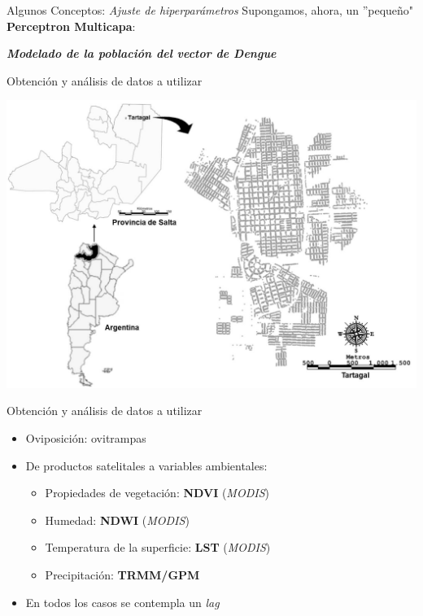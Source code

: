\documentclass[10pt]{beamer}
\newcommand\IncrFont{\fontsize{20}{20}\selectfont}
\begin{document}
\begin{frame}{Algunos Conceptos: \textit{Ajuste de hiperparámetros}}
  Supongamos, ahora, un ''pequeño" \textbf{Perceptron Multicapa}:
  \pause

  \mlp
\end{frame}



\begin{frame}{}
  \IncrFont
  \begin{center}
    \textit{\textbf{Modelado de la población del vector de Dengue}}
  \end{center}
\end{frame}


\begin{frame}{Obtención y análisis de datos a utilizar}
  \begin{center}
    \includegraphics[width=.8\textwidth]{tartagal}
  \end{center}
\end{frame}


\begin{frame}{Obtención y análisis de datos a utilizar}
\begin{itemize}[<+->]
  \item Oviposición: ovitrampas
  \item De productos satelitales a variables ambientales:
      \begin{itemize}
        \item Propiedades de vegetación: \textbf{NDVI} (\textit{MODIS})
        \item Humedad: \textbf{NDWI} (\textit{MODIS})
        \item Temperatura de la superficie: \textbf{LST} (\textit{MODIS})
        \item Precipitación: \textbf{TRMM/GPM}
      \end{itemize}
  \item En todos los casos se contempla un \textit{lag}
\end{itemize}
\end{frame}
\end{document}
